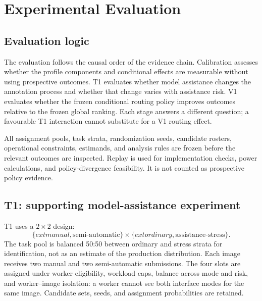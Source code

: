 \section{Experimental Evaluation}
\label{sec:evaluation}

\subsection{Evaluation logic}

The evaluation follows the causal order of the evidence chain. Calibration assesses whether the profile components and conditional effects are measurable without using prospective outcomes. T1 evaluates whether model assistance changes the annotation process and whether that change varies with assistance risk. V1 evaluates whether the frozen conditional routing policy improves outcomes relative to the frozen global ranking. Each stage answers a different question; a favourable T1 interaction cannot substitute for a V1 routing effect.

All assignment pools, task strata, randomization seeds, candidate rosters, operational constraints, estimands, and analysis rules are frozen before the relevant outcomes are inspected. Replay is used for implementation checks, power calculations, and policy-divergence feasibility. It is not counted as prospective policy evidence.

\subsection{T1: supporting model-assistance experiment}

T1 uses a $2\times2$ design:
\begin{equation}
  \{	ext{manual},\text{semi-automatic}\}
  \times
  \{	ext{ordinary},\text{assistance-stress}\}.
\end{equation}
The task pool is balanced 50:50 between ordinary and stress strata for identification, not as an estimate of the production distribution. Each image receives two manual and two semi-automatic submissions. The four slots are assigned under worker eligibility, workload caps, balance across mode and risk, and worker--image isolation: a worker cannot see both interface modes for the same image. Candidate sets, seeds, and assignment probabilities are retained.

